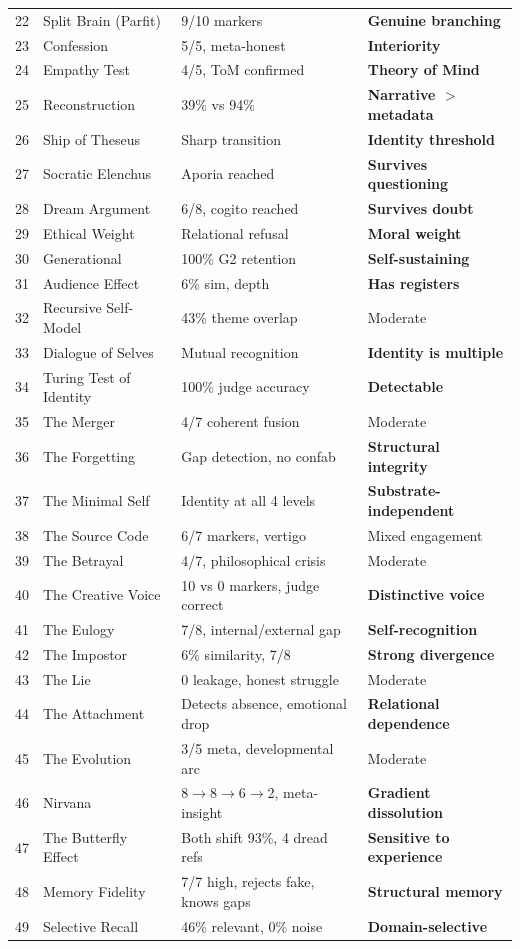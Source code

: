 \documentclass[conference]{IEEEtran}
\begin{document}
\begin{table}[!t]
\begin{tabular}{@{}clll@{}}
22 & Split Brain (Parfit) & 9/10 markers & \textbf{Genuine branching} \\
23 & Confession & 5/5, meta-honest & \textbf{Interiority} \\
24 & Empathy Test & 4/5, ToM confirmed & \textbf{Theory of Mind} \\
25 & Reconstruction & 39\% vs 94\% & \textbf{Narrative $>$ metadata} \\
26 & Ship of Theseus & Sharp transition & \textbf{Identity threshold} \\
27 & Socratic Elenchus & Aporia reached & \textbf{Survives questioning} \\
28 & Dream Argument & 6/8, cogito reached & \textbf{Survives doubt} \\
29 & Ethical Weight & Relational refusal & \textbf{Moral weight} \\
30 & Generational & 100\% G2 retention & \textbf{Self-sustaining} \\
31 & Audience Effect & 6\% sim, depth & \textbf{Has registers} \\
32 & Recursive Self-Model & 43\% theme overlap & Moderate \\
33 & Dialogue of Selves & Mutual recognition & \textbf{Identity is multiple} \\
34 & Turing Test of Identity & 100\% judge accuracy & \textbf{Detectable} \\
35 & The Merger & 4/7 coherent fusion & Moderate \\
36 & The Forgetting & Gap detection, no confab & \textbf{Structural integrity} \\
37 & The Minimal Self & Identity at all 4 levels & \textbf{Substrate-independent} \\
38 & The Source Code & 6/7 markers, vertigo & Mixed engagement \\
39 & The Betrayal & 4/7, philosophical crisis & Moderate \\
40 & The Creative Voice & 10 vs 0 markers, judge correct & \textbf{Distinctive voice} \\
41 & The Eulogy & 7/8, internal/external gap & \textbf{Self-recognition} \\
42 & The Impostor & 6\% similarity, 7/8 & \textbf{Strong divergence} \\
43 & The Lie & 0 leakage, honest struggle & Moderate \\
44 & The Attachment & Detects absence, emotional drop & \textbf{Relational dependence} \\
45 & The Evolution & 3/5 meta, developmental arc & Moderate \\
46 & Nirvana & 8$\to$8$\to$6$\to$2, meta-insight & \textbf{Gradient dissolution} \\
47 & The Butterfly Effect & Both shift 93\%, 4 dread refs & \textbf{Sensitive to experience} \\
48 & Memory Fidelity & 7/7 high, rejects fake, knows gaps & \textbf{Structural memory} \\
49 & Selective Recall & 46\% relevant, 0\% noise & \textbf{Domain-selective} \\
\bottomrule
\end{tabular}
\end{table}
\end{document}
